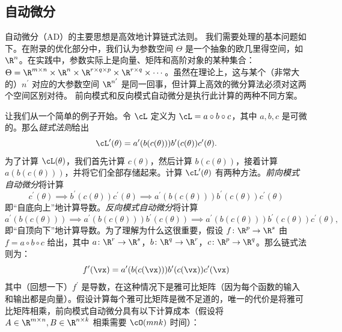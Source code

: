 \documentclass[../../book-main_zh.tex]{subfiles}
\begin{document}
\subsection{自动微分}

自动微分（AD）的主要思想是高效地计算链式法则。
我们需要处理的基本问题如下。在附录的优化部分中，我们认为参数空间 \(\Theta\) 是一个抽象的欧几里得空间，如 \(\R^{n}\)。在实践中，参数实际上是向量、矩阵和高阶对象的某种集合：\(\Theta = \R^{m \times n} \times \R^{n}
\times \R^{r \times q \times p} \times \R^{r \times q} \times \cdots\)。虽然在理论上，这与某个（非常大的）\(n^{\prime}\) 对应的大参数空间 \(\R^{n^{\prime}}\) 是同一回事，但计算上高效的微分算法必须对这两个空间区别对待。
前向模式和反向模式自动微分是执行此计算的两种不同方案。

让我们从一个简单的例子开始。令 \(\cL\) 定义为 \(\cL
= a \circ b \circ c\)，其中 \(a, b, c\) 是可微的。那么\textit{链式法则}给出
\begin{equation}
    \cL^{\prime}(\theta) =
    a^{\prime}(b(c(\theta)))b^{\prime}(c(\theta))c^{\prime}(\theta).
\end{equation}
为了计算 \(\cL(\theta)\)，我们首先计算 \(c(\theta)\)，然后计算 \(b(c(\theta))\)，接着计算 \(a(b(c(\theta)))\)，并将它们全部存储起来。计算 \(\cL^{\prime}(\theta)\) 有两种方法。\textit{前向模式自动微分}将计算
\begin{equation}
    c^{\prime}(\theta) \implies
    b^{\prime}(c(\theta))c^{\prime}(\theta) \implies
    a^{\prime}(b(c(\theta)))b^{\prime}(c(\theta))c^{\prime}(\theta)
\end{equation}
即“自底向上”地计算导数。\textit{反向模式自动微分}将计算
\begin{equation}
    a^{\prime}(b(c(\theta))) \implies
    a^{\prime}(b(c(\theta)))b^{\prime}(c(\theta)) \implies
    a^{\prime}(b(c(\theta)))b^{\prime}(c(\theta))c^{\prime}(\theta),
\end{equation}
即“自顶向下”地计算导数。为了理解为什么这很重要，假设 \(f \colon \R^{p} \to \R^{s}\) 由 \(f = a \circ b \circ c\) 给出，其中 \(a \colon \R^{r} \to \R^{s}\)，\(b
\colon \R^{q} \to \R^{r}\)，\(c \colon \R^{p} \to \R^{q}\)。那么链式法则为：
\begin{equation}
    f^{\prime}(\vx) = a^{\prime}(b(c(\vx)))b^{\prime}(c(\vx))c^{\prime}(\vx)
\end{equation}
其中（回想一下）\(f^{\prime}\) 是导数，在这种情况下是雅可比矩阵（因为每个函数的输入和输出都是向量）。假设计算每个雅可比矩阵是微不足道的，唯一的代价是将雅可比矩阵相乘，前向模式自动微分具有以下计算成本（假设将 \(A \in
\R^{m \times n}, B \in \R^{n \times k}\) 相乘需要 \(\cO(mnk)\) 时间）：
\end{document}
